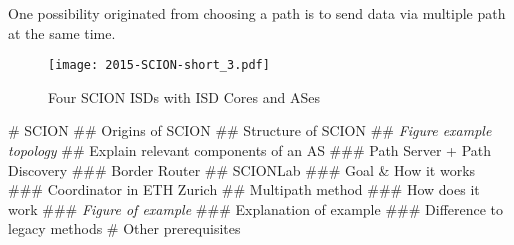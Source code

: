 \documentclass[thesis.tex]{subfiles}
\begin{document}
One possibility originated from choosing a path is to send data via multiple path at the same time. 

\begin{figure}
	\centering
	\texttt{[image: 2015-SCION-short\_3.pdf]}
	\label{fig:prequirement:scionStructure}
	\caption{Four SCION ISDs with ISD Cores and ASes \cite{SCIONPaper}}
\end{figure}


\begin{easylist}
    \MyListProperties
    # SCION
    ## Origins of SCION
    ## Structure of SCION
    ## \textit{Figure example topology}
    ## Explain relevant components of an AS
    ### Path Server + Path Discovery
    ### Border Router
    ## SCIONLab
    ### Goal \& How it works
    ### Coordinator in ETH Zurich
    ## Multipath method
    ### How does it work
    ### \textit{Figure of example}
    ### Explanation of example
    ### Difference to legacy methods
    # Other prerequisites
\end{easylist}

\subfilebib %
\end{document}
